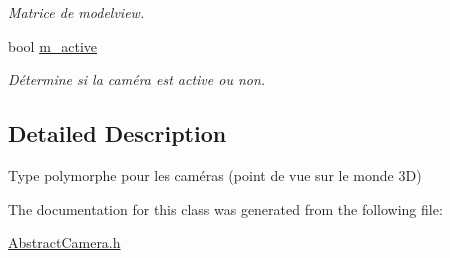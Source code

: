\begin{DoxyCompactItemize}
\begin{DoxyCompactList}\small\item\em Matrice de modelview. \end{DoxyCompactList}\item 
\hypertarget{classAbstractCamera_ad40646721bbb5ec24fe9fb2080763e51}{bool \hyperlink{classAbstractCamera_ad40646721bbb5ec24fe9fb2080763e51}{m\-\_\-active}}\label{classAbstractCamera_ad40646721bbb5ec24fe9fb2080763e51}

\begin{DoxyCompactList}\small\item\em Détermine si la caméra est active ou non. \end{DoxyCompactList}\end{DoxyCompactItemize}


\subsection{Detailed Description}
Type polymorphe pour les caméras (point de vue sur le monde 3\-D) 

The documentation for this class was generated from the following file\-:\begin{DoxyCompactItemize}
\item 
\hyperlink{AbstractCamera_8h}{Abstract\-Camera.\-h}\end{DoxyCompactItemize}
